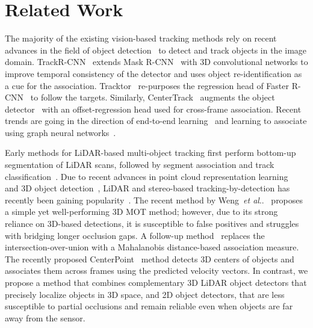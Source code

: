 \documentclass[letterpaper, 10 pt, conference]{ieeeconf}
\makeatletter
\DeclareRobustCommand\onedot{\futurelet\@let@token\@onedot}
\def\@onedot{\ifx\@let@token.\else.\null\fi\xspace}
\def\etal{\emph{et al}\onedot}
\newcommand{\PAR}[1]{\vskip4pt \noindent {\bf #1~}}
\makeatother
\begin{document}
\section{Related Work}

\PAR{2D MOT.} The majority of the existing vision-based tracking methods rely on recent advances in the field of object detection~\cite{Ren15NIPS, He17ICCV} to detect and track objects in the image domain. 
TrackR-CNN~\cite{Voigtlaender19CVPR} extends Mask R-CNN~\cite{He17ICCV} with 3D convolutional networks {to improve temporal consistency of the detector} and uses object re-identification as a cue for the association. 
Tracktor~\cite{Bergmann19ICCV} re-purposes the regression head of Faster R-CNN~\cite{Ren15NIPS} to follow the targets. Similarly, CenterTrack~\cite{zhou2020tracking} augments the object detector~\cite{zhou2019objects} with an offset-regression head used for cross-frame association.  
Recent trends are going in the direction of end-to-end learning~\cite{xu20cvpr, Frossard18ICRA} and learning to associate using graph neural networks~\cite{braso2020learning, weng20cvpr}.

\PAR{3D MOT.} 
Early methods for LiDAR-based multi-object tracking first perform bottom-up segmentation of LiDAR scans, followed by segment association and track classification~\cite{Teichman11ICRA, Moosmann13ICRA}. 
Due to recent advances in point cloud representation learning~\cite{Qi17CVPR_pointnet, Qi17NIPS} and 3D object detection~\cite{Chen15NIPS, Point-GNN, Shi19CVPR}, LiDAR and stereo-based tracking-by-detection has recently been gaining popularity~\cite{Osep17ICRA, Frossard18ICRA}. 
The recent method by Weng~\etal~\cite{Weng2020_AB3DMOT} proposes a simple yet well-performing 3D MOT method; however, due to its strong reliance on 3D-based detections, it is susceptible to false positives and struggles with bridging longer occlusion gaps. A follow-up method~\cite{chiu2020probabilistic} replaces the intersection-over-union with a Mahalanobis distance-based association measure. 
The recently proposed CenterPoint~\cite{yin2020center} method detects 3D centers of objects and associates them across frames using the predicted velocity vectors. 
In contrast, we propose a method that combines complementary 3D LiDAR object detectors that precisely localize objects in 3D space, and 2D object detectors, that are less susceptible to partial occlusions and remain reliable even when objects are far away from the sensor. 
\end{document}
